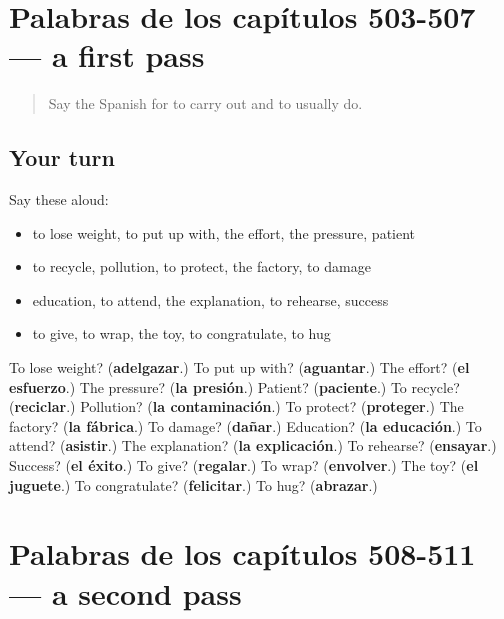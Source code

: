 \section[(dialogue)]{Palabras de los capítulos 503-507 — a first pass}

\label{lesson:ES-R511-repaso-palabras-de-los-capitulos-503-507}



\begin{quote}
Say the Spanish for to carry out and to usually do.
\end{quote}

\subsection*{Your turn}
Say these aloud:

\begin{itemize}
\raggedright
  \item to lose weight, to put up with, the effort, the pressure, patient
  \item to recycle, pollution, to protect, the factory, to damage
  \item education, to attend, the explanation, to rehearse, success
  \item to give, to wrap, the toy, to congratulate, to hug
\end{itemize}

\begin{tcolorbox}[breakable,colback=teal!4,colframe=teal!35!black,title={Before you move on}]
To lose weight? (\textbf{adelgazar}.) To put up with? (\textbf{aguantar}.) The effort? (\textbf{el esfuerzo}.) The pressure? (\textbf{la presión}.) Patient? (\textbf{paciente}.) To recycle? (\textbf{reciclar}.) Pollution? (\textbf{la contaminación}.) To protect? (\textbf{proteger}.) The factory? (\textbf{la fábrica}.) To damage? (\textbf{dañar}.) Education? (\textbf{la educación}.) To attend? (\textbf{asistir}.) The explanation? (\textbf{la explicación}.) To rehearse? (\textbf{ensayar}.) Success? (\textbf{el éxito}.) To give? (\textbf{regalar}.) To wrap? (\textbf{envolver}.) The toy? (\textbf{el juguete}.) To congratulate? (\textbf{felicitar}.) To hug? (\textbf{abrazar}.)
\end{tcolorbox}
\section[(dialogue)]{Palabras de los capítulos 508-511 — a second pass}

\label{lesson:ES-R511-repaso-palabras-de-los-capitulos-508-511}



